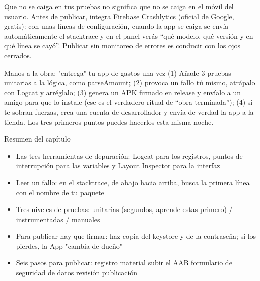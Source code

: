 
Que no se caiga en tus pruebas no significa que no se caiga en el móvil del usuario. Antes de publicar, integra Firebase Crashlytics (oficial de Google, gratis): con unas líneas de configuración, cuando la app se caiga se envía automáticamente el stacktrace y en el panel verás “qué modelo, qué versión y en qué línea se cayó”. Publicar sin monitoreo de errores es conducir con los ojos cerrados.

\begin{tcbpractice}{Manos a la obra: "entrega" tu app de gastos una vez}
(1) Añade 3 pruebas unitarias a la lógica, como parseAmount; (2) provoca un fallo tú mismo, atrápalo con Logcat y arréglalo; (3) genera un APK firmado en release y envíalo a un amigo para que lo instale (ese es el verdadero ritual de “obra terminada”); (4) si te sobran fuerzas, crea una cuenta de desarrollador y envía de verdad la app a la tienda. Los tres primeros puntos puedes hacerlos esta misma noche.

\end{tcbpractice}

\begin{tcbsummary}{Resumen del capítulo}
\begin{itemize}
  \item Las tres herramientas de depuración: Logcat para los registros, puntos de interrupción para las variables y Layout Inspector para la interfaz
  \item Leer un fallo: en el stacktrace, de abajo hacia arriba, busca la primera línea con el nombre de tu paquete
  \item Tres niveles de pruebas: unitarias (segundos, aprende estas primero) / instrumentadas / manuales
  \item Para publicar hay que firmar: haz copia del keystore y de la contraseña; si los pierdes, la App "cambia de dueño"
  \item Seis pasos para publicar: registro material subir el AAB formulario de seguridad de datos revisión publicación
\end{itemize}

\end{tcbsummary}

